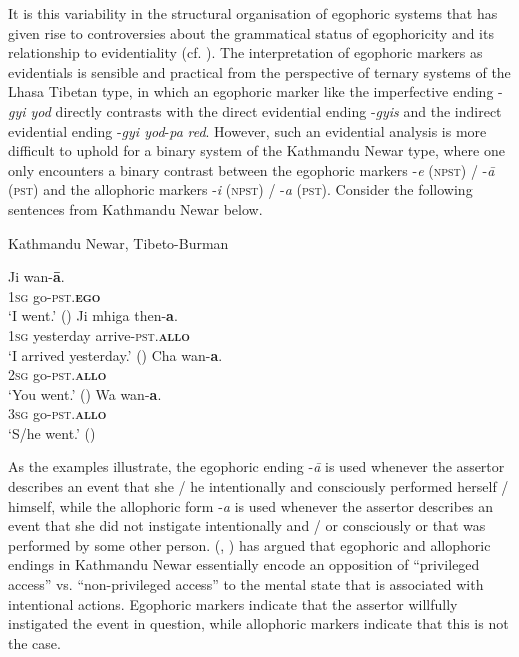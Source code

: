 \documentclass[output=paper]{langsci/langscibook}
\begin{document}
It is this variability in the structural organisation of egophoric systems that has given rise to controversies about the grammatical status of egophoricity and its relationship to evidentiality (cf. \citealt[295–296]{Widmer2017b}). The interpretation of egophoric markers as evidentials is sensible and practical from the perspective of ternary systems of the Lhasa Tibetan type, in which an egophoric marker like the imperfective ending -\textit{gyi yod} directly contrasts with the direct evidential ending -\textit{gyis} and the indirect evidential ending -\textit{gyi yod}-\textit{pa} \textit{red}. However, such an evidential analysis is more difficult to uphold for a binary system of the Kathmandu Newar type, where one only encounters a binary contrast between the egophoric markers -\textit{e} (\textsc{npst}) / -\textit{ā} (\textsc{pst}) and the allophoric markers -\textit{i} (\textsc{npst}) / -\textit{a} (\textsc{pst}). Consider the following sentences from Kathmandu Newar below.

\begin{exe}
	\ex Kathmandu Newar, Tibeto-Burman\label{ex:mw1}
	\begin{xlist}
		\ex \label{ex:mw1a}
		\gll Ji	wan-\textbf{ā}.\\
		1\textsc{sg} go-\textsc{pst}.\textbf{\textsc{ego}}\\
		\trans ‘I went.’ (\citealt[12]{Hargreaves2005})
		\ex \label{ex:mw1b}
		\gll Ji	mhiga then-\textbf{a}.\\
		1\textsc{sg} yesterday arrive-\textsc{pst}.\textbf{\textsc{allo}}\\
		\trans ‘I arrived yesterday.’ (\citealt[13]{Hargreaves2005})
		\ex \label{ex:mw1c}
		\gll Cha	 wan-\textbf{a}.\\
		2\textsc{sg} go-\textsc{pst}.\textbf{\textsc{allo}}\\
		\trans ‘You went.’ (\citealt[12]{Hargreaves2005})
		\ex \label{ex:mw1d}
		\gll Wa	wan-\textbf{a}.\\
		3\textsc{sg} go-\textsc{pst}.\textbf{\textsc{allo}}\\
		\trans ‘S/he went.’ (\citealt[12]{Hargreaves2005})
	\end{xlist}
\end{exe}

As the examples illustrate, the egophoric ending -\textit{ā} is used whenever the assertor describes an event that she / he intentionally and consciously performed herself / himself, while the allophoric form -\textit{a} is used whenever the assertor describes an event that she did not instigate intentionally and / or consciously or that was performed by some other person. \citeauthor{Hargreaves1991} (\citeyear{Hargreaves1991}, \citeyear{Hargreaves2005}) has argued that egophoric and allophoric endings in Kathmandu Newar essentially encode an opposition of “privileged access” vs. “non-privileged access” to the mental state that is associated with intentional actions. Egophoric markers indicate that the assertor willfully instigated the event in question, while allophoric markers indicate that this is not the case.
\end{document}
